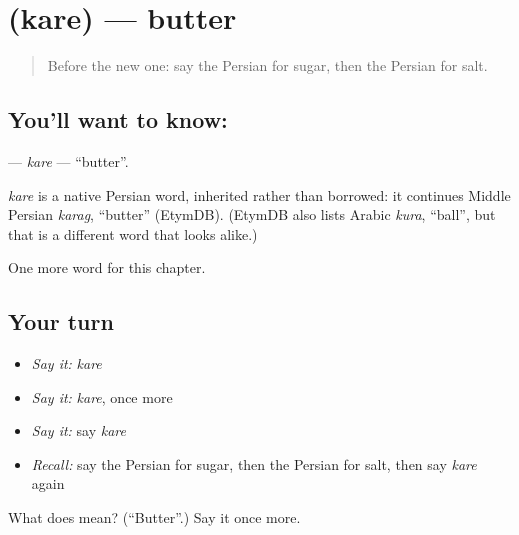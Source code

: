 \section[\texorpdfstring{\fa{کره} (kare)}{کره (kare)}]{ (kare) — butter}

\label{lesson:FA-C42-kare}



\begin{quote}
Before the new one: say the Persian for sugar, then the Persian for salt.
\end{quote}

\subsection*{You'll want to know: }
\textbf{} — \emph{kare} — \textquotedblleft{}butter\textquotedblright{}.

\begin{cousinweb}
\emph{kare} is a native Persian word, inherited rather than borrowed: it continues Middle Persian \emph{karag}, \textquotedblleft{}butter\textquotedblright{} (EtymDB). (EtymDB also lists Arabic \emph{kura}, \textquotedblleft{}ball\textquotedblright{}, but that is a different word that looks alike.)
\end{cousinweb}

\begin{grammarlens}[title={What you've built}]
One more word for this chapter.
\end{grammarlens}

\subsection*{Your turn}
\begin{itemize}
\raggedright
  \item \emph{Say it:} \emph{kare}
  \item \emph{Say it:} \emph{kare}, once more
  \item \emph{Say it:} say \emph{kare}
  \item \emph{Recall:} say the Persian for sugar, then the Persian for salt, then say \emph{kare} again
\end{itemize}

\begin{tcolorbox}[breakable,colback=teal!4,colframe=teal!35!black,title={Before you move on}]
What does  mean? (\textquotedblleft{}Butter\textquotedblright{}.) Say it once more.
\end{tcolorbox}
